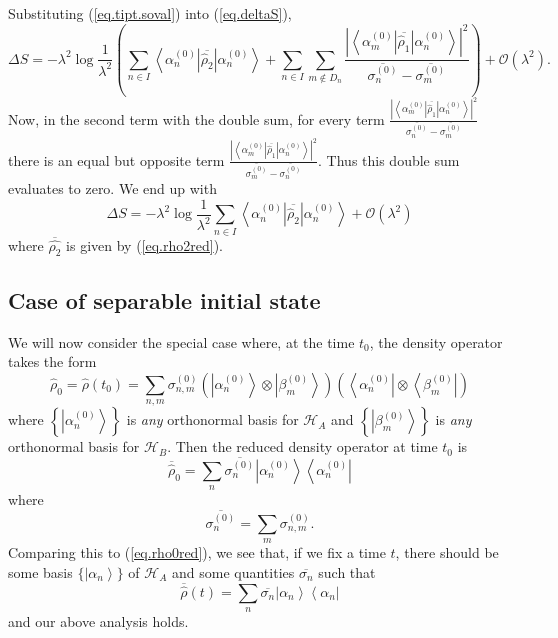 \documentclass[11pt]{article}
\newcommand{\Od}[1]{\mathcal{O}{\left(#1\right)}}
\newcommand{\bra}[1]{\left\langle#1\right|}
\newcommand{\ket}[1]{\left|#1\right\rangle}
\newcommand{\hilb}{\mathcal{H}}
\newcommand{\op}[1]{\hat{#1}}
\theoremstyle{theorem}
\theoremstyle{remark}
\theoremstyle{step}
\theoremstyle{gap}
\begin{document}
Substituting (\ref{eq.tipt.soval}) into (\ref{eq.deltaS}),
\[
\Delta S = -\lambda^2 \log\frac{1}{\lambda^2}\left(\sum_{n \in I} \bra{\alpha_n^{(0)}}\overline{\op{\rho}_2}\ket{\alpha_n^{(0)}} +  \sum_{n \in I} \sum_{m \not\in D_n} \frac{\left|\bra{\alpha_m^{(0)}} \overline{\op{\rho}_1} \ket{\alpha_n^{(0)}}\right|^2}{\overline{\sigma_n^{(0)}}-\overline{\sigma_m^{(0)}}} \right)+ \Od{\lambda^2}.
\]
Now, in the second term with the double sum, for every term \(\frac{\left|\bra{\alpha_m^{(0)}} \overline{\op{\rho}_1} \ket{\alpha_n^{(0)}}\right|^2}{\overline{\sigma_n^{(0)}}-\overline{\sigma_m^{(0)}}}\) there is an equal but opposite term \(\frac{\left|\bra{\alpha_m^{(0)}} \overline{\op{\rho}_1} \ket{\alpha_n^{(0)}}\right|^2}{\overline{\sigma_m^{(0)}}-\overline{\sigma_n^{(0)}}}\). Thus this double sum evaluates to zero. We end up with
\begin{equation}\label{eq.entropyresultwithrho2}
\boxed{\Delta S = -\lambda^2 \log\frac{1}{\lambda^2}\sum_{n \in I} \bra{\alpha_n^{(0)}}\overline{\op{\rho}_2}\ket{\alpha_n^{(0)}} + \Od{\lambda^2}}
\end{equation}
where \(\overline{\op{\rho_2}}\) is given by (\ref{eq.rho2red}).

\subsection{Case of separable initial state}

We will now consider the special case where, at the time \(t_0\), the density operator takes the form
\begin{equation}
\label{eq.rho0full}
\op{\rho}_0 = \op{\rho}\left(t_0\right) = \sum_{n,m} \sigma_{n,m}^{(0)} \left(\ket{\alpha_n^{(0)}}\otimes\ket{\beta_m^{(0)}}\right) \left(\bra{\alpha_n^{(0)}}\otimes\bra{\beta_m^{(0)}}\right)
\end{equation}
where \(\left\{\ket{\alpha_n^{(0)}}\right\}\) is \emph{any} orthonormal basis for \(\hilb_A\) and \(\left\{\ket{\beta_m^{(0)}}\right\}\) is \emph{any} orthonormal basis for \(\hilb_B\). Then the reduced density operator at time \(t_0\) is
\[
\overline{\op{\rho}}_0 = \sum_n \overline{\sigma_{n}^{(0)}} \ket{\alpha_n^{(0)}}\bra{\alpha_n^{(0)}}
\]
where
\[
\overline{\sigma_n^{(0)}} = \sum_m \sigma_{n,m}^{(0)}.
\]
Comparing this to (\ref{eq.rho0red}), we see that, if we fix a time \(t\), there should be some basis \(\{\ket{\alpha_n}\}\) of \(\hilb_A\) and some quantities \(\overline{\sigma_n}\) such that
\[
\overline{\op{\rho}}(t) = \sum_n \overline{\sigma_n} \ket{\alpha_n}\bra{\alpha_n}
\]
and our above analysis holds.
\end{document}
